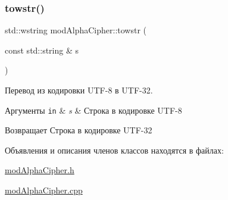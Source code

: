 \subsubsection{\texorpdfstring{towstr()}{towstr()}}
{\footnotesize\ttfamily std\+::wstring mod\+Alpha\+Cipher\+::towstr (\begin{DoxyParamCaption}\item[{const std\+::string \&}]{s }\end{DoxyParamCaption})}



Перевод из кодировки U\+T\+F-\/8 в U\+T\+F-\/32. 


\begin{DoxyParams}[1]{Аргументы}
\mbox{\tt in}  & {\em s} & Строка в кодировке U\+T\+F-\/8 \\
\hline
\end{DoxyParams}
\begin{DoxyReturn}{Возвращает}
Строка в кодировке U\+T\+F-\/32 
\end{DoxyReturn}


Объявления и описания членов классов находятся в файлах\+:\begin{DoxyCompactItemize}
\item 
\hyperlink{modAlphaCipher_8h}{mod\+Alpha\+Cipher.\+h}\item 
\hyperlink{modAlphaCipher_8cpp}{mod\+Alpha\+Cipher.\+cpp}\end{DoxyCompactItemize}

